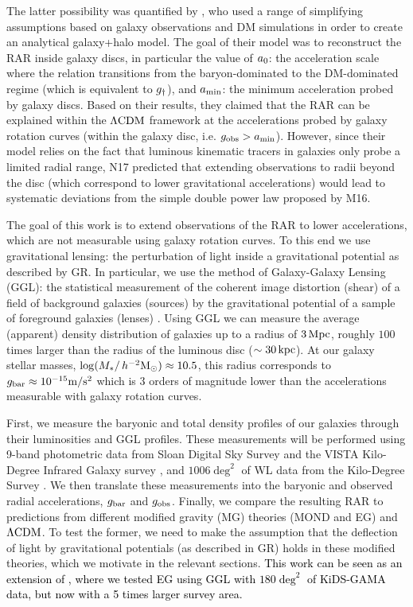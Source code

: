 \documentclass[usenatbib]{mnras}
\newcommand{\hmsun}{\,h^{-2} {\rm M_\odot}}
\newcommand{\mpss}{ {\rm m/s^2} }
\newcommand{\lcdm}{{\rm \Lambda CDM}}
\newcommand{\un}[1]{_{\rm #1}}
\begin{document}
The latter possibility was quantified by \citet[][hereafter N17]{navarro2017}, who used a range of simplifying assumptions based on galaxy observations and DM simulations in order to create an analytical galaxy+halo model. The goal of their model was to reconstruct the RAR inside galaxy discs, in particular the value of $a\un{0}$: the acceleration scale where the relation transitions from the baryon-dominated to the DM-dominated regime (which is equivalent to $g\un{\dagger}$), and $a\un{min}$: the minimum acceleration probed by galaxy discs. Based on their results, they claimed that the RAR can be explained within the $\lcdm$ framework at the accelerations probed by galaxy rotation curves (within the galaxy disc, i.e. $g\un{obs}>a\un{min}$). However, since their model relies on the fact that luminous kinematic tracers in galaxies only probe a limited radial range, N17 predicted that extending observations to radii beyond the disc (which correspond to lower gravitational accelerations) would lead to systematic deviations from the simple double power law proposed by M16.

The goal of this work is to extend observations of the RAR to lower accelerations, which are not measurable using galaxy rotation curves. To this end we use gravitational lensing: the perturbation of light inside a gravitational potential as described by GR. In particular, we use the method of Galaxy-Galaxy Lensing (GGL): the statistical measurement of the coherent image distortion (shear) of a field of background galaxies (sources) by the gravitational potential of a sample of foreground galaxies (lenses) \cite[for examples, see e.g.][]{fischer2000ggl,hoekstra2004,mandelbaum2006,uitert2016}. Using GGL we can measure the average (apparent) density distribution of galaxies up to a radius of $3\,{\rm Mpc}$, roughly $100$ times larger than the radius of the luminous disc ($\sim 30\,{\rm kpc}$). At our galaxy stellar masses, $\log(M_*/\hmsun) \approx 10.5$, this radius corresponds to $g\un{bar}\approx10^{-15} \mpss$ which is $3$ orders of magnitude lower than the accelerations measurable with galaxy rotation curves.

First, we measure the baryonic and total density profiles of our galaxies through their luminosities and GGL profiles. These measurements will be performed using 9-band photometric data from Sloan Digital Sky Survey \cite[SDSS,]{abazajian2009} and the VISTA Kilo-Degree Infrared Galaxy survey \cite[VIKING]{edge2013}, and $1006 \deg^2$ of WL data from the Kilo-Degree Survey \textcolor{black}{\cite[KiDS-1000;][]{dejong2013,kuijken2019}}. We then translate these measurements into the baryonic and observed radial accelerations, $g\un{bar}$ and $g\un{obs}$. Finally, we compare the resulting RAR to predictions from different modified gravity (MG) theories (MOND and EG) and $\lcdm$. To test the former, we need to make the assumption that the deflection of light by gravitational potentials (as described in GR) holds in these modified theories, which we motivate in the relevant sections. \textcolor{black}{This work can be seen as an extension of \cite{brouwer2017}, where we tested EG using GGL with $180 \deg^2$ of KiDS-GAMA data, but now with a 5 times larger survey area.}
\end{document}
